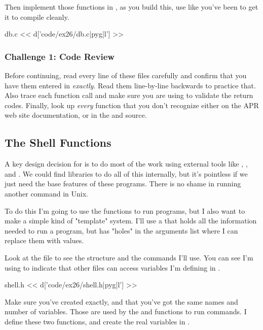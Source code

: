 Then implement those functions in , as you build this, use
 like you've been to get it to compile cleanly.

\begin{code}{db.c}
<< d['code/ex26/db.c|pyg|l'] >>
\end{code}

\subsubsection{Challenge 1: Code Review}

Before continuing, read every line of these files carefully and 
confirm that you have them entered in \emph{exactly}.  Read them
line-by-line backwards to practice that. Also trace each function 
call and make sure you are using  to validate the
return codes.  Finally, look up \emph{every} function that you
don't recognize either on the APR web site documentation, or
in the  and  source.


\subsection{The Shell Functions}

A key design decision for  is to do most of the work
using external tools like , , and .
We could find libraries to do all of this internally, but it's pointless
if we just need the base features of these programs.  There is no shame
in running another command in Unix.

To do this I'm going to use the  functions
to run programs, but I also want to make a simple kind of "template"
system.  I'll use a  that holds all the information
needed to run a program, but has "holes" in the arguments list where I
can replace them with values.

Look at the  file to see the structure and the commands I'll use.
You can see I'm using  to indicate that other  files
can access variables I'm defining in .

\begin{code}{shell.h}
<< d['code/ex26/shell.h|pyg|l'] >>
\end{code}

Make sure you've created  exactly, and that you've got the
same names and number of  variables.  Those are used
by the  and  functions to run commands.
I define these two functions, and create the real variables in .


